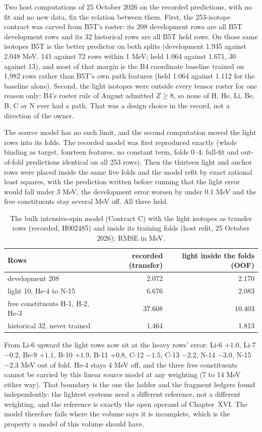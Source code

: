 Two host computations of 25 October 2026 on the recorded predictions, with no fit and no new data, fix the relation between them.\cite{viisameroster,viilightrefit} First, the 253-isotope contract was carved from B5T's roster: its 208 development rows are all B5T development rows and its 32 historical rows are all B5T held rows. On those same isotopes B5T is the better predictor on both splits (development 1.935 against 2.048 MeV, 141 against 72 rows within 1 MeV; held 1.064 against 1.671, 30 against 13), and most of that margin is the B4 coordinate baseline trained on 1,982 rows rather than B5T's own path features (held 1.064 against 1.112 for the baseline alone). Second, the light isotopes were outside every tensor roster for one reason only: B4's roster rule of August admitted $Z\ge8$, so none of H, He, Li, Be, B, C or N ever had a path. That was a design choice in the record, not a direction of the owner.

The source model has no such limit, and the second computation moved the light rows into its folds. The recorded model was first reproduced exactly (whole binding as target, fourteen features, no constant term, folds 0--4: full-fit and out-of-fold predictions identical on all 253 rows). Then the thirteen light and anchor rows were placed inside the same five folds and the model refit by exact rational least squares, with the prediction written before running that the light error would fall under 3 MeV, the development error worsen by under 0.1 MeV and the free constituents stay several MeV off. All three held.

\begin{table}[tb]
\centering\small
\begin{tabular}{lrr}
\hline
Rows & recorded (transfer) & light inside the folds (OOF)\\
\hline
development 208 & 2.072 & 2.170\\
light 10, He-4 to N-15 & 6.676 & 2.083\\
free constituents H-1, H-2, He-3 & 37.608 & 10.403\\
historical 32, never trained & 1.464 & 1.813\\
\hline
\end{tabular}
\caption{The bulk intensive-spin model (Contract C) with the light isotopes as transfer rows (recorded, H002485) and inside its training folds (host refit, 25 October 2026); RMSE in MeV.}
\label{v2c5:lightrefit}
\end{table}

From Li-6 upward the light rows now sit at the heavy rows' error: Li-6 $+1.0$, Li-7 $-0.2$, Be-9 $+1.1$, B-10 $+1.9$, B-11 $+0.8$, C-12 $-1.5$, C-13 $-2.2$, N-14 $-3.0$, N-15 $-2.3$ MeV out of fold. He-4 stays 4 MeV off, and the three free constituents cannot be carried by this linear source model at any weighting (7 to 14 MeV either way). That boundary is the one the ladder and the fragment ledgers found independently: the lightest systems need a different reference, not a different weighting, and the reference is exactly the open operand of Chapter~XVI. The model therefore fails where the volume says it is incomplete, which is the property a model of this volume should have.

